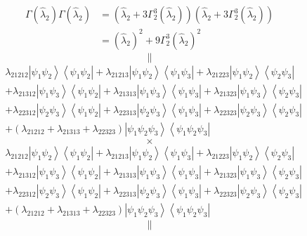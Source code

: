 \documentclass[aps,preprint]{revtex4}%
\begin{document}
\begin{align}
\Gamma\left(  \hat{\lambda}_{2}\right)  \Gamma\left(  \hat{\lambda}%
_{2}\right)    & =\left(  \hat{\lambda}_{2}+3\Gamma_{2}^{3}\left(
\hat{\lambda}_{2}\right)  \right)  \left(  \hat{\lambda}_{2}+3\Gamma_{2}%
^{3}\left(  \hat{\lambda}_{2}\right)  \right)  \nonumber\\
& =\left(  \hat{\lambda}_{2}\right)  ^{2}+9\Gamma_{2}^{3}\left(  \hat{\lambda
}_{2}\right)  ^{2}%
\end{align}%
\[
\parallel
\]%
\begin{align}
& \lambda_{21212}\left\vert \psi_{1}\psi_{2}\right\rangle \left\langle
\psi_{1}\psi_{2}\right\vert +\lambda_{21213}\left\vert \psi_{1}\psi
_{2}\right\rangle \left\langle \psi_{1}\psi_{3}\right\vert +\lambda
_{21223}\left\vert \psi_{1}\psi_{2}\right\rangle \left\langle \psi_{2}\psi
_{3}\right\vert \nonumber\\
& +\lambda_{21312}\left\vert \psi_{1}\psi_{3}\right\rangle \left\langle
\psi_{1}\psi_{2}\right\vert +\lambda_{21313}\left\vert \psi_{1}\psi
_{3}\right\rangle \left\langle \psi_{1}\psi_{3}\right\vert +\lambda
_{21323}\left\vert \psi_{1}\psi_{3}\right\rangle \left\langle \psi_{2}\psi
_{3}\right\vert \nonumber\\
& +\lambda_{22312}\left\vert \psi_{2}\psi_{3}\right\rangle \left\langle
\psi_{1}\psi_{2}\right\vert +\lambda_{22313}\left\vert \psi_{2}\psi
_{3}\right\rangle \left\langle \psi_{1}\psi_{3}\right\vert +\lambda
_{22323}\left\vert \psi_{2}\psi_{3}\right\rangle \left\langle \psi_{2}\psi
_{3}\right\vert \nonumber\\
& +\left(  \lambda_{21212}+\lambda_{21313}+\lambda_{22323}\right)  \left\vert
\psi_{1}\psi_{2}\psi_{3}\right\rangle \left\langle \psi_{1}\psi_{2}\psi
_{3}\right\vert
\end{align}%
\[
\times
\]%
\begin{align}
& \lambda_{21212}\left\vert \psi_{1}\psi_{2}\right\rangle \left\langle
\psi_{1}\psi_{2}\right\vert +\lambda_{21213}\left\vert \psi_{1}\psi
_{2}\right\rangle \left\langle \psi_{1}\psi_{3}\right\vert +\lambda
_{21223}\left\vert \psi_{1}\psi_{2}\right\rangle \left\langle \psi_{2}\psi
_{3}\right\vert \nonumber\\
& +\lambda_{21312}\left\vert \psi_{1}\psi_{3}\right\rangle \left\langle
\psi_{1}\psi_{2}\right\vert +\lambda_{21313}\left\vert \psi_{1}\psi
_{3}\right\rangle \left\langle \psi_{1}\psi_{3}\right\vert +\lambda
_{21323}\left\vert \psi_{1}\psi_{3}\right\rangle \left\langle \psi_{2}\psi
_{3}\right\vert \nonumber\\
& +\lambda_{22312}\left\vert \psi_{2}\psi_{3}\right\rangle \left\langle
\psi_{1}\psi_{2}\right\vert +\lambda_{22313}\left\vert \psi_{2}\psi
_{3}\right\rangle \left\langle \psi_{1}\psi_{3}\right\vert +\lambda
_{22323}\left\vert \psi_{2}\psi_{3}\right\rangle \left\langle \psi_{2}\psi
_{3}\right\vert \nonumber\\
& +\left(  \lambda_{21212}+\lambda_{21313}+\lambda_{22323}\right)  \left\vert
\psi_{1}\psi_{2}\psi_{3}\right\rangle \left\langle \psi_{1}\psi_{2}\psi
_{3}\right\vert
\end{align}%
\[
\parallel
\]
%
\end{document}
